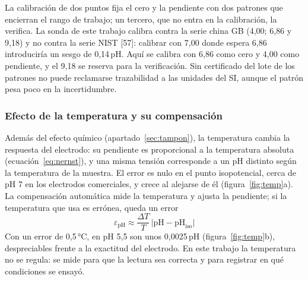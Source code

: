 La calibración de dos puntos fija el cero y la pendiente con dos patrones que encierran el rango de trabajo; un tercero, que no entra en la calibración, la verifica. La sonda de este trabajo calibra contra la serie china GB (4,00; 6,86 y 9,18) y no contra la serie NIST [57]: calibrar con 7,00 donde espera 6,86 introduciría un sesgo de 0,14\,pH. Aquí se calibra con 6,86 como cero y 4,00 como pendiente, y el 9,18 se reserva para la verificación. Sin certificado del lote de los patrones no puede reclamarse trazabilidad a las unidades del SI, aunque el patrón pesa poco en la incertidumbre.

\subsubsection{Efecto de la temperatura y su compensación}\label{sec:temperatura}
Además del efecto químico (apartado~\ref{sec:tampon}), la temperatura cambia la respuesta del electrodo: su pendiente es proporcional a la temperatura absoluta (ecuación~\eqref{eq:nernst}), y una misma tensión corresponde a un pH distinto según la temperatura de la muestra. El error es nulo en el punto isopotencial, cerca de pH 7 en los electrodos comerciales, y crece al alejarse de él (figura~\ref{fig:temp}a). La compensación automática mide la temperatura y ajusta la pendiente; si la temperatura que usa es errónea, queda un error
\begin{equation}
\varepsilon_{\mathrm{pH}}\approx\frac{\Delta T}{T}\,\bigl|\mathrm{pH}-\mathrm{pH}_{\text{iso}}\bigr|\label{eq:comp}
\end{equation}
Con un error de 0,5\,°C, en pH 5,5 son unos 0,0025\,pH (figura~\ref{fig:temp}b), despreciables frente a la exactitud del electrodo. En este trabajo la temperatura no se regula: se mide para que la lectura sea correcta y para registrar en qué condiciones se ensayó.


